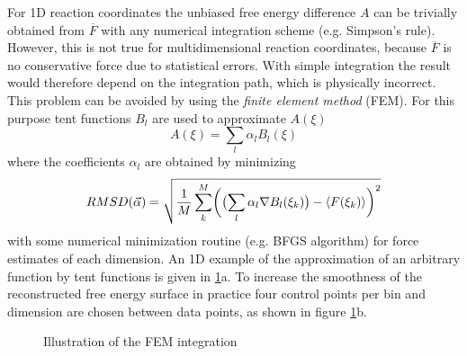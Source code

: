 For 1D reaction coordinates the unbiased free energy difference $A$ can be trivially obtained from $\overline{F}$ with any numerical integration scheme (e.g. Simpson's rule).
However, this is not true for multidimensional reaction coordinates, because $\overline{F}$ is no conservative force due to statistical errors. With simple integration the result would therefore depend on the integration path, which is physically incorrect. This problem can be avoided by using the \textit{finite element method} (FEM).\autocite{darve2008adaptive} For this purpose tent functions $B_l$ are used to approximate $A(\xi)$
\begin{equation}
  A(\xi) = \sum_l \alpha_l B_l(\xi)
\end{equation}
where the coefficients $\alpha_l$ are obtained by minimizing
\begin{equation}
  RMSD(\vec{\alpha})=\sqrt{\frac{1}{M}\sum_k^M\biggl(\bigl(\sum_l \alpha_l \nabla B_l(\xi_k)\bigr) - \braket{F(\xi_k)} \biggr)^2}
\end{equation}
with some numerical minimization routine (e.g. BFGS algorithm\autocite{nocedal2006numerical}) for force estimates of each dimension. An 1D example of the approximation of an arbitrary function by tent functions is given in \ref{fig:FEM}a. To increase the smoothness of the reconstructed free energy surface in practice four control points per bin and dimension are chosen between data points, as shown in figure \ref{fig:FEM}b.
\begin{figure}[H]
    \centering
    \caption{Illustration of the FEM integration}
\label{fig:FEM}%
\end{figure}

